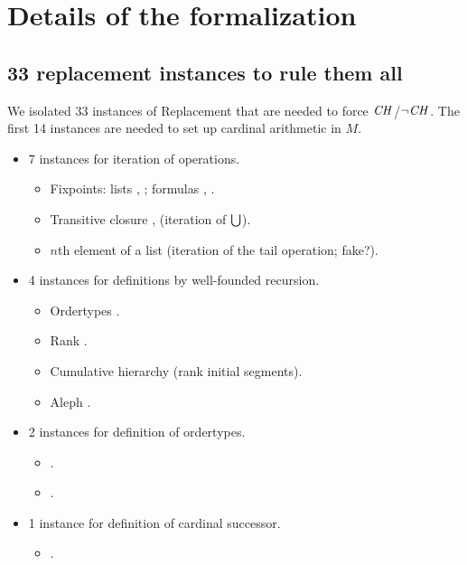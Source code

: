 \section{Details of the formalization}

\subsection{33 replacement instances to rule them all}
We isolated 33 instances of Replacement that are needed to force
$\mathit{CH}$/$\neg\mathit{CH}$. The first 14 instances are needed to set up
cardinal arithmetic in $M$.

\begin{itemize}
\item 7 instances for iteration of operations.
  \begin{itemize}
  \item Fixpoints: lists
    ,
    ; formulas
    ,
    .
  \item Transitive closure ,
     (iteration of $\mathop{\textstyle\bigcup}$).
  \item $n$th element of a list  (iteration of the tail operation; fake?).
  \end{itemize}
  
\item 4 instances for definitions by well-founded recursion.
  \begin{itemize}
  \item Ordertypes
    .
  \item Rank .
  \item Cumulative hierarchy  (rank initial segments).
  \item Aleph .
  \end{itemize}
  
\item 2 instances for definition of ordertypes.
  \begin{itemize}
  \item {}.
  \item {}.
  \end{itemize}
\item 1 instance for definition of cardinal successor.
  \begin{itemize}
  \item
    .
  \end{itemize}
\end{itemize}

